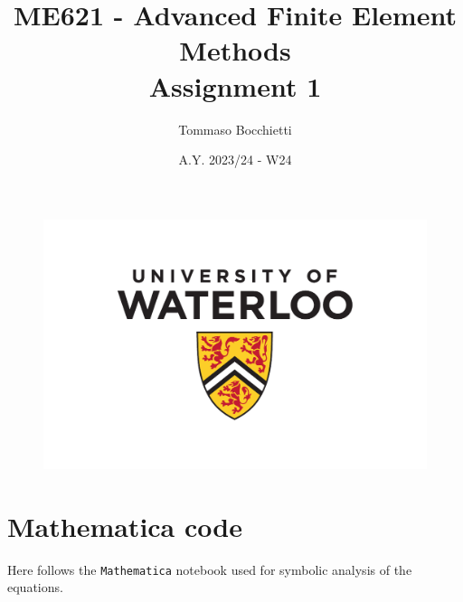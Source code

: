 \documentclass{../../commons/assignment}
\begin{document}
\graphicspath{{./img/}}


\title{ME621 - Advanced Finite Element Methods \\ Assignment 1}
\author{Tommaso Bocchietti}
\date{A.Y. 2023/24 - W24}

\maketitle

\begin{figure}[H]
    \centering
    \includegraphics[width=.9\textwidth]{./pdf/UniversityOfWaterloo_logo_vert_pms}
    \label{fig:University_Of_Waterloo_logo}
\end{figure}

\clearpage
\tableofcontents
\listoffigures
\listoftables
\pagebreak









\appendix
\section{Mathematica code}
\label{sec:appendix}

Here follows the \texttt{Mathematica} notebook used for symbolic analysis of the equations.


\end{document}
